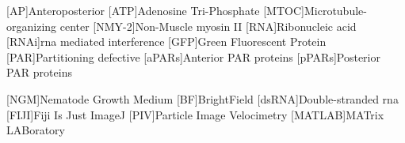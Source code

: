 \begin{acronym}

[AP]{Anteroposterior}
[ATP]{Adenosine Tri-Phosphate}
[MTOC]{Microtubule-organizing center}
[NMY-2]{Non-Muscle myosin II}
[RNA]{Ribonucleic acid}
[RNAi]{\acs{rna} mediated interference}
[GFP]{Green Fluorescent Protein}
[PAR]{Partitioning defective}
[aPARs]{Anterior PAR proteins}
[pPARs]{Posterior PAR proteins}

[NGM]{Nematode Growth Medium}
[BF]{BrightField}
[dsRNA]{Double-stranded \acs{rna}}
[FIJI]{Fiji Is Just ImageJ}
[PIV]{Particle Image Velocimetry}
[MATLAB]{MATrix LABoratory}

\end{acronym}